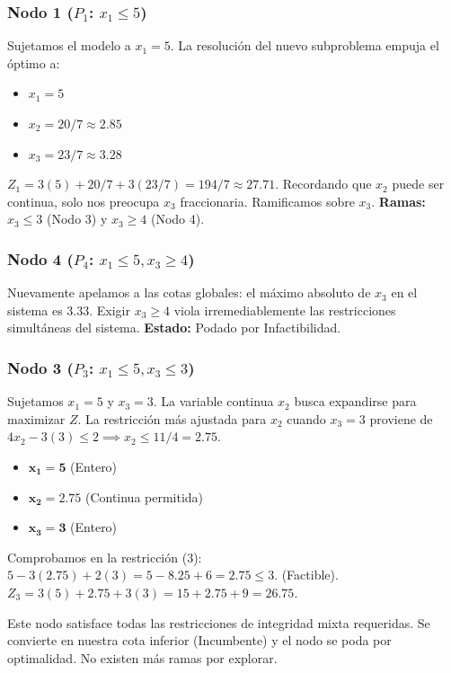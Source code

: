 \documentclass[10pt,a4paper]{article}
\begin{document}
\subsubsection*{Nodo 1 ($P_1$: $x_1 \leq 5$)}
Sujetamos el modelo a $x_1 = 5$. La resolución del nuevo subproblema empuja el óptimo a:
\begin{itemize}
    \item $x_1 = 5$
    \item $x_2 = 20/7 \approx 2.85$
    \item $x_3 = 23/7 \approx 3.28$
\end{itemize}
$Z_1 = 3(5) + 20/7 + 3(23/7) = 194/7 \approx \mathbf{27.71}$.
Recordando que $x_2$ puede ser continua, solo nos preocupa $x_3$ fraccionaria. Ramificamos sobre $x_3$.
\textbf{Ramas:} $x_3 \leq 3$ (Nodo 3) y $x_3 \geq 4$ (Nodo 4).

\subsubsection*{Nodo 4 ($P_4$: $x_1 \leq 5, x_3 \geq 4$)}
Nuevamente apelamos a las cotas globales: el máximo absoluto de $x_3$ en el sistema es $3.33$. Exigir $x_3 \geq 4$ viola irremediablemente las restricciones simultáneas del sistema.
\textbf{Estado:} Podado por Infactibilidad.

\subsubsection*{Nodo 3 ($P_3$: $x_1 \leq 5, x_3 \leq 3$)}
Sujetamos $x_1 = 5$ y $x_3 = 3$. La variable continua $x_2$ busca expandirse para maximizar $Z$. La restricción más ajustada para $x_2$ cuando $x_3=3$ proviene de $4x_2 - 3(3) \leq 2 \implies x_2 \leq 11/4 = 2.75$.
\begin{itemize}
    \item $\mathbf{x_1 = 5}$ (Entero)
    \item $\mathbf{x_2 = 2.75}$ (Continua permitida)
    \item $\mathbf{x_3 = 3}$ (Entero)
\end{itemize}
Comprobamos en la restricción (3): $5 - 3(2.75) + 2(3) = 5 - 8.25 + 6 = 2.75 \leq 3$. (Factible).
$Z_3 = 3(5) + 2.75 + 3(3) = 15 + 2.75 + 9 = \mathbf{26.75}$.

Este nodo satisface todas las restricciones de integridad mixta requeridas. Se convierte en nuestra cota inferior (Incumbente) y el nodo se poda por optimalidad. No existen más ramas por explorar.
\end{document}
